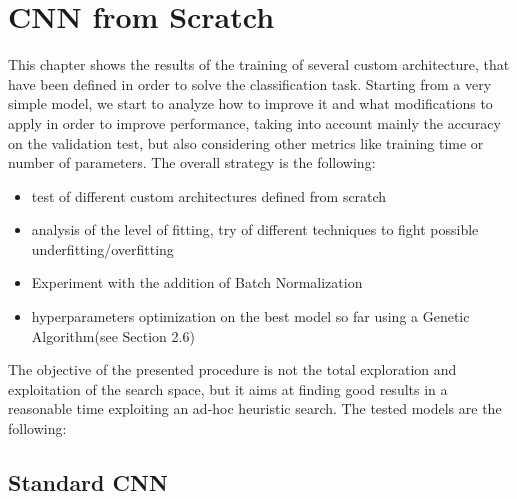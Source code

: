 \section{CNN from Scratch}
This chapter shows the results of the training of several custom architecture, that have been defined in order to solve the classification task.
Starting from a very simple model, we start to analyze how to improve it and what modifications to apply in order to improve performance, taking into account mainly the accuracy on the validation test, but also considering other metrics like training time or number of parameters.
The overall strategy is the following:
\begin{itemize}
\item test of different custom architectures defined from scratch
\item analysis of the level of fitting, try of different techniques to fight possible underfitting/overfitting
\item Experiment with the addition of Batch Normalization
\item hyperparameters optimization on the best model so far using a Genetic Algorithm(see Section 2.6)
\end{itemize}

The objective of the presented procedure is not the total exploration and exploitation of the search space, but it aims at finding good results in a reasonable time exploiting an ad-hoc heuristic search.
The tested models are the following:

\subsection{Standard CNN}
